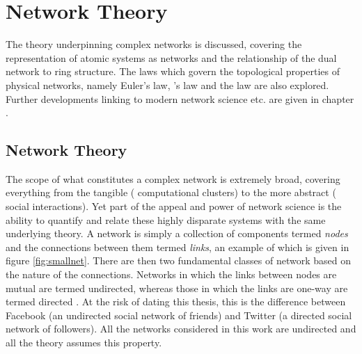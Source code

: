\chapter{Network Theory}
\label{ch:networktheory}

\begin{chapterabstract}
The theory underpinning complex networks is discussed, covering the representation of atomic systems as networks and the relationship of the dual network to ring structure.
The laws which govern the topological properties of physical networks, namely Euler's law, \lm's law and the \aw{} law are also explored.
Further developments linking to modern network science etc. are given in chapter .
\end{chapterabstract}

\section{Network Theory}
\label{sec:networktheory}

The scope of what constitutes a complex network is extremely broad, covering everything from the tangible (\eg{} computational clusters) to the more abstract (\eg{} social interactions). Yet part of the appeal and power of network science is the ability to quantify and relate these highly disparate systems with the same underlying theory.
A network is simply a collection of components termed \textit{nodes} and the connections between them termed \textit{links}, an example of which is given in figure \ref{fig:smallnet}.
There are then two fundamental classes of network based on the nature of the connections.
Networks in which the links between nodes are mutual are termed undirected, whereas those in which the links are one\--way are termed directed \cite{barabasi2016n}.
At the risk of dating this thesis, this is the difference between Facebook (an undirected social network of friends) and Twitter (a directed social network of followers).
All the networks considered in this work are undirected and all the theory assumes this property.

